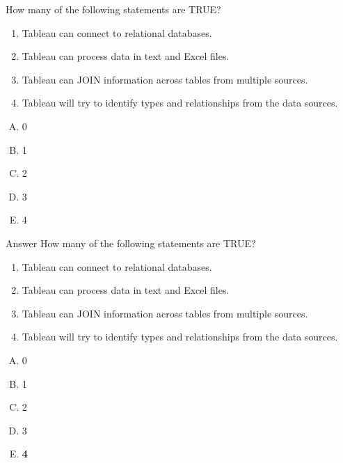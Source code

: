 \documentclass[xcolor=svgnames]{beamer} %
\begin{document}
\begin{frame}
\begin{example}
How many of the following statements are TRUE?
\begin{enumerate}
\item Tableau can connect to  relational databases.
\item  Tableau can process data in text and Excel files.
\item  Tableau can JOIN information across tables from multiple sources.
\item  Tableau will try to identify types and relationships from the data sources.
\end{enumerate}
\begin{multicols}{5}
\begin{enumerate}[A)]
\item 0 
\item 1
\item 2
\item 3
\item 4
\end{enumerate}
\end{multicols}

\end{example}
\end{frame}



\begin{frame}
\begin{block}{Answer}
How many of the following statements are TRUE?
\begin{enumerate}
\item Tableau can connect to  relational databases. \pcmark
\item  Tableau can process data in text and Excel files.\pcmark
\item  Tableau can JOIN information across tables from multiple sources.\pcmark
\item  Tableau will try to identify types and relationships from the data sources.\pcmark
\end{enumerate}
\begin{multicols}{5}
\begin{enumerate}[A)]
\item 0 
\item 1
\item 2
\item 3
\item {\bf 4}
\end{enumerate}
\end{multicols}

\end{block}
\end{frame}
\end{document}
